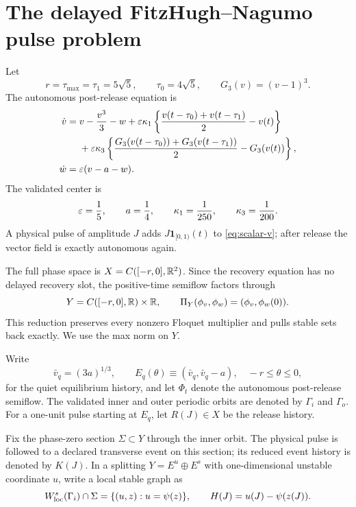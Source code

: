 \section{The delayed FitzHugh--Nagumo pulse problem}\label{sec:model}

Let
\[
 r=\tau_{\max}=\tau_1=5\sqrt5,
 \qquad \tau_0=4\sqrt5,
 \qquad G_3(v)=(v-1)^3.
\]
The autonomous post-release equation is
\begin{align}
 \dot v={}&v-\frac{v^3}{3}-w
 +\varepsilon\kappa_1\left\{\frac{v(t-\tau_0)+v(t-\tau_1)}2-v(t)\right\}
 \notag\\
 &+\varepsilon\kappa_3\left\{
 \frac{G_3(v(t-\tau_0))+G_3(v(t-\tau_1))}{2}-G_3(v(t))\right\},
 \label{eq:scalar-v}\\
 \dot w={}&\varepsilon(v-a-w).\label{eq:scalar-w}
\end{align}
The validated center is
\begin{equation}
 \varepsilon=\frac15,\qquad a=\frac14,\qquad
 \kappa_1=\frac1{250},\qquad \kappa_3=\frac1{200}.       \label{eq:center}
\end{equation}
A physical pulse of amplitude \(J\) adds
\(J\mathbf1_{[0,1)}(t)\) to \cref{eq:scalar-v}; after release the vector
field is exactly autonomous again.

The full phase space is \(X=C([-r,0],\mathbb R^2)\).  Since the recovery equation has
no delayed recovery slot, the positive-time semiflow factors through
\begin{equation}
 Y=C([-r,0],\mathbb R)\times\mathbb R,
 \qquad
 \Pi_Y(\phi_v,\phi_w)=(\phi_v,\phi_w(0)).               \label{eq:reduced-space}
\end{equation}
This reduction preserves every nonzero Floquet multiplier and pulls stable
sets back exactly.  We use the max norm on \(Y\).

Write
\begin{equation}
 \bar v_q=(3a)^{1/3},\qquad
 E_q(\theta)\equiv(\bar v_q,\bar v_q-a),
 \quad-r\le\theta\le0,                                  \label{eq:quiet-equilibrium}
\end{equation}
for the quiet equilibrium history, and let \(\Phi_t\) denote the autonomous
post-release semiflow.  The validated inner and outer periodic orbits are
denoted by \(\Gamma_i\) and \(\Gamma_o\).  For a one-unit pulse starting at
\(E_q\), let \(R(J)\in X\) be the release history.

Fix the phase-zero section \(\Sigma\subset Y\) through the inner orbit.  The
physical pulse is followed to a declared transverse event on this section;
its reduced event history is denoted by \(K(J)\).  In a splitting
\(Y=E^u\oplus E^s\) with one-dimensional unstable coordinate \(u\), write a
local stable graph as
\begin{equation}
 W^s_{\rm loc}(\Gamma_i)\cap\Sigma
 =\{(u,z):u=\psi(z)\},
 \qquad H(J)=u(J)-\psi(z(J)).                            \label{eq:pulse-gap}
\end{equation}

